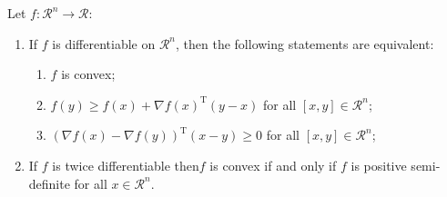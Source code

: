 \begin{thm}\label{Theorem_Convex3}
   Let $f:\mathcal{R}^{n}\rightarrow\mathcal{R}$:
     \begin{enumerate}
        \item If $f$ is differentiable on $\mathcal{R}^{n}$, then the following statements are equivalent:
             \begin{enumerate}
                 \item $f$ is convex;
                 \item $f(y)\ge f(x)+\nabla f(x)^{\text{T}}\left(y-x\right)$ for all $[x,y]\in\mathcal{R}^{n}$;
                 \item $\left(\nabla f(x)-\nabla f(y)\right)^{\text{T}}(x-y) \ge 0$ for all $[x,y]\in\mathcal{R}^{n}$;
             \end{enumerate}
        \item If $f$ is twice differentiable then$f$ is convex if and only if $f$ is positive semi-definite for all $x\in\mathcal{R}^{n}$.
     \end{enumerate}
\end{thm}

